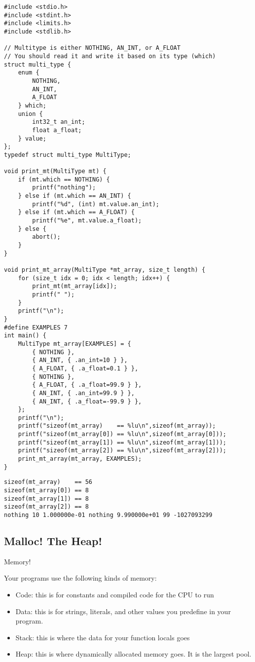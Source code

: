 \documentclass[11pt]{article}
\begin{document}
\begin{verbatim}
#include <stdio.h>
#include <stdint.h>
#include <limits.h>
#include <stdlib.h>

// Multitype is either NOTHING, AN_INT, or A_FLOAT
// You should read it and write it based on its type (which)
struct multi_type {
    enum {
        NOTHING,
        AN_INT,
        A_FLOAT
    } which;
    union {
        int32_t an_int;
        float a_float;
    } value;
};
typedef struct multi_type MultiType;

void print_mt(MultiType mt) {
    if (mt.which == NOTHING) {
        printf("nothing");
    } else if (mt.which == AN_INT) {
        printf("%d", (int) mt.value.an_int);
    } else if (mt.which == A_FLOAT) {
        printf("%e", mt.value.a_float);
    } else {
        abort();
    }
}

void print_mt_array(MultiType *mt_array, size_t length) {
    for (size_t idx = 0; idx < length; idx++) {
        print_mt(mt_array[idx]);
        printf(" ");
    }
    printf("\n");
}
#define EXAMPLES 7
int main() {
    MultiType mt_array[EXAMPLES] = {
        { NOTHING },
        { AN_INT, { .an_int=10 } },
        { A_FLOAT, { .a_float=0.1 } },
        { NOTHING },
        { A_FLOAT, { .a_float=99.9 } },
        { AN_INT, { .an_int=99.9 } },
        { AN_INT, { .a_float=-99.9 } },
    };
    printf("\n");
    printf("sizeof(mt_array)    == %lu\n",sizeof(mt_array));
    printf("sizeof(mt_array[0]) == %lu\n",sizeof(mt_array[0]));
    printf("sizeof(mt_array[1]) == %lu\n",sizeof(mt_array[1]));
    printf("sizeof(mt_array[2]) == %lu\n",sizeof(mt_array[2]));
    print_mt_array(mt_array, EXAMPLES);
}
\end{verbatim}

\begin{verbatim}
sizeof(mt_array)    == 56
sizeof(mt_array[0]) == 8
sizeof(mt_array[1]) == 8
sizeof(mt_array[2]) == 8
nothing 10 1.000000e-01 nothing 9.990000e+01 99 -1027093299
\end{verbatim}

\subsection{Malloc! The Heap!}
\label{sec:orgf6a2669}

Memory!

Your programs use the following kinds of memory:
\begin{itemize}
\item Code: this is for constants and compiled code for the CPU to run
\item Data: this is for strings, literals, and other values you predefine
in your program.
\item Stack: this is where the data for your function locals goes
\item Heap: this is where dynamically allocated memory goes. It is the largest pool.
\end{itemize}
\end{document}
